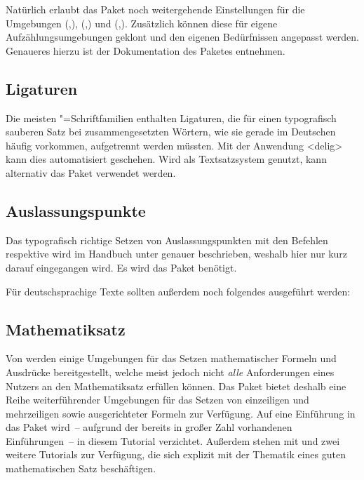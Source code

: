 \documentclass[%
  english,ngerman,%
  cdgeometry=no,DIV=12,automark%
]{tudscrartcl}
\begin{document}
Natürlich erlaubt das Paket noch weitergehende Einstellungen für die Umgebungen 
(,),
(,) und
(,). 
Zusätzlich können diese für eigene Aufzählungsumgebungen geklont und den 
eigenen Bedürfnissen angepasst werden. Genaueres hierzu ist der Dokumentation 
des Paketes  entnehmen.


\subsection{Ligaturen}
Die meisten "=Schriftfamilien enthalten Ligaturen, die für einen 
typografisch sauberen Satz bei zusammengesetzten Wörtern, wie sie gerade im 
Deutschen häufig vorkommen, aufgetrennt werden müssten. Mit der Anwendung 
<delig> kann dies automatisiert geschehen. Wird 
 als Textsatzsystem genutzt, kann alternativ das Paket 
 verwendet werden.


\subsection{Auslassungspunkte}
Das typografisch richtige Setzen von Auslassungspunkten mit den Befehlen 
 respektive  wird im Handbuch unter 
 genauer 
beschrieben, weshalb hier nur kurz darauf eingegangen wird. Es wird das Paket 
 benötigt.
%
\begin{Preamble}
\usepackage{ellipsis}
\end{Preamble}
%
Für deutschsprachige Texte sollten außerdem noch folgendes ausgeführt werden:
%
\begin{Preamble}
\let\ellipsispunctuation\relax

\end{Preamble}


\subsection{Mathematiksatz}
Von  werden einige Umgebungen für das Setzen mathematischer 
Formeln und Ausdrücke bereitgestellt, welche meist jedoch nicht \emph{alle} 
Anforderungen eines Nutzers an den Mathematiksatz erfüllen können. Das Paket
 bietet deshalb eine Reihe weiterführender Umgebungen für das 
Setzen von einzeiligen und mehrzeiligen sowie ausgerichteter Formeln zur 
Verfügung. Auf eine Einführung in das Paket wird~-- aufgrund der bereits in 
großer Zahl vorhandenen Einführungen~-- in diesem Tutorial verzichtet. Außerdem 
stehen mit  und  zwei weitere Tutorials 
zur Verfügung, die sich explizit mit der Thematik eines guten mathematischen 
Satz beschäftigen.
\end{document}
